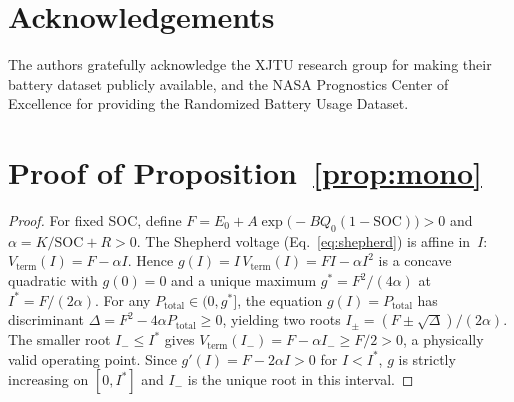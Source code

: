 \documentclass[5p,times,number]{elsarticle}
\newcommand{\propref}[1]{\textcolor{supercolor}{Proposition~\ref{#1}}}
\newcommand{\eqnrefp}[1]{\textcolor{supercolor}{Eq.~\ref{#1}}}
\begin{document}
\section*{Acknowledgements}
The authors gratefully acknowledge the XJTU research group for making their battery dataset publicly available, and the NASA Prognostics Center of Excellence for providing the Randomized Battery Usage Dataset.

\appendix
\section{Proof of \propref{prop:mono}}\label{app:proof}
\begin{proof}
For fixed SOC, define $F = E_0 + A\exp\!\bigl(-BQ_0(1-\mathrm{SOC})\bigr) > 0$ and $\alpha = K/\mathrm{SOC} + R > 0$.
The Shepherd voltage (\eqnrefp{eq:shepherd}) is affine in~$I$: $V_{\mathrm{term}}(I) = F - \alpha I$.
Hence $g(I) = I\,V_{\mathrm{term}}(I) = FI - \alpha I^2$ is a concave quadratic with $g(0) = 0$ and a unique maximum $g^* = F^2/(4\alpha)$ at $I^* = F/(2\alpha)$.
For any $P_{\mathrm{total}} \in (0, g^*]$, the equation $g(I) = P_{\mathrm{total}}$ has discriminant $\Delta = F^2 - 4\alpha P_{\mathrm{total}} \ge 0$, yielding two roots $I_{\pm} = (F \pm \sqrt{\Delta})/(2\alpha)$.
The smaller root $I_- \le I^*$ gives $V_{\mathrm{term}}(I_-) = F - \alpha I_- \ge F/2 > 0$, a physically valid operating point.
Since $g'(I) = F - 2\alpha I > 0$ for $I < I^*$, $g$ is strictly increasing on $[0, I^*]$ and $I_-$ is the unique root in this interval.
\end{proof}



\end{document}
